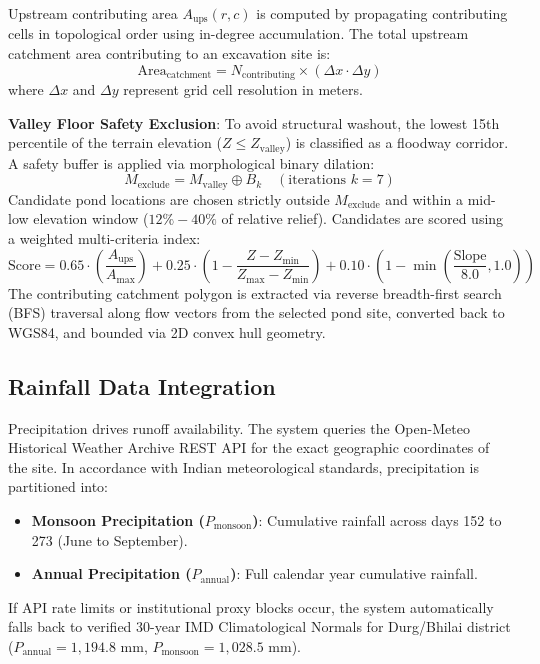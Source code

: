 \documentclass[manuscript,screen,nonacm]{acmart}
\begin{document}
Upstream contributing area $A_{\text{ups}}(r, c)$ is computed by propagating contributing cells in topological order using in-degree accumulation. The total upstream catchment area contributing to an excavation site is:
\begin{equation}
\text{Area}_{\text{catchment}} = N_{\text{contributing}} \times (\Delta x \cdot \Delta y)
\end{equation}
where $\Delta x$ and $\Delta y$ represent grid cell resolution in meters.

\noindent \textbf{Valley Floor Safety Exclusion}: To avoid structural washout, the lowest 15th percentile of the terrain elevation ($Z \le Z_{\text{valley}}$) is classified as a floodway corridor. A safety buffer is applied via morphological binary dilation:
\begin{equation}
M_{\text{exclude}} = M_{\text{valley}} \oplus B_k \quad (\text{iterations } k = 7)
\end{equation}
Candidate pond locations are chosen strictly outside $M_{\text{exclude}}$ and within a mid-low elevation window ($12\% - 40\%$ of relative relief). Candidates are scored using a weighted multi-criteria index:
\begin{equation}
\text{Score} = 0.65 \cdot \left(\frac{A_{\text{ups}}}{A_{\max}}\right) + 0.25 \cdot \left(1 - \frac{Z - Z_{\min}}{Z_{\max} - Z_{\min}}\right) + 0.10 \cdot \left(1 - \min\left(\frac{\text{Slope}}{8.0}, 1.0\right)\right)
\end{equation}
The contributing catchment polygon is extracted via reverse breadth-first search (BFS) traversal along flow vectors from the selected pond site, converted back to WGS84, and bounded via 2D convex hull geometry.

\subsection{Rainfall Data Integration}
Precipitation drives runoff availability. The system queries the Open-Meteo Historical Weather Archive REST API for the exact geographic coordinates of the site. In accordance with Indian meteorological standards, precipitation is partitioned into:
\begin{itemize}
    \item \textbf{Monsoon Precipitation ($P_{\text{monsoon}}$)}: Cumulative rainfall across days 152 to 273 (June to September).
    \item \textbf{Annual Precipitation ($P_{\text{annual}}$)}: Full calendar year cumulative rainfall.
\end{itemize}
If API rate limits or institutional proxy blocks occur, the system automatically falls back to verified 30-year IMD Climatological Normals for Durg/Bhilai district ($P_{\text{annual}} = 1,194.8\text{ mm}$, $P_{\text{monsoon}} = 1,028.5\text{ mm}$).
\end{document}
